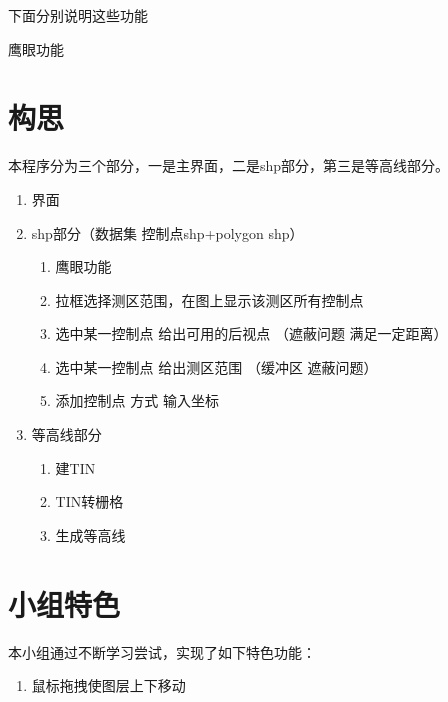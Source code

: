 \documentclass[twoside,color=blue,mathpazo,titlestyle=hang,12pt]{elegantbook}
\numberwithin{equation}{section}
\begin{document}
下面分别说明这些功能
\begin{description}
\item[鹰眼功能] 
\end{description}






    

\chapter{构思}

本程序分为三个部分，一是主界面，二是shp部分，第三是等高线部分。

\begin{enumerate}
\item 界面
\item shp部分（数据集 控制点shp+polygon shp）
\begin{enumerate}
\item 鹰眼功能
\item 拉框选择测区范围，在图上显示该测区所有控制点
\item 选中某一控制点 给出可用的后视点 （遮蔽问题 满足一定距离）
\item 选中某一控制点 给出测区范围     （缓冲区 遮蔽问题）
\item 添加控制点 方式 输入坐标
\end{enumerate}
\item 等高线部分
\begin{enumerate}
\item 建TIN
\item TIN转栅格
\item 生成等高线
\end{enumerate}
\end{enumerate}
   

\chapter{小组特色}

本小组通过不断学习尝试，实现了如下特色功能：
\begin{enumerate}
\item 鼠标拖拽使图层上下移动
\end{enumerate}

% 
% 
\end{document}
